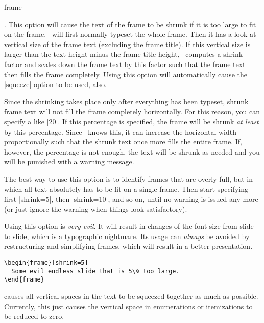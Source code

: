 \begin{environment}{{frame}}
\begin{frame}[<+->][plain]
\begin{frame}
  \item
    . This option will cause the text of the frame to be shrunk if it is too large to fit on the frame. \beamer\ will first normally typeset the whole frame. Then it has a look at vertical size of the frame text (excluding the frame title). If this vertical size is larger than the text height minus the frame title height, \beamer\ computes a shrink factor and scales down the frame text by this factor such that the frame text then fills the frame completely. Using this option will automatically cause the |squeeze| option to be used, also.

    Since the shrinking takes place only after everything has been typeset, shrunk frame text will not fill the frame completely horizontally. For this reason, you can specify a  like |20|. If this percentage is specified, the frame will be shrunk \emph{at least} by this percentage. Since \beamer\ knows this, it can increase the horizontal width proportionally such that the shrunk text once more fills the entire frame. If, however, the percentage is not enough, the text will be shrunk as needed and you will be punished with a warning message.

    The best way to use this option is to identify frames that are overly full, but in which all text absolutely has to be fit on a single frame. Then start specifying first |shrink=5|, then |shrink=10|, and so on, until no warning is issued any more (or just ignore the warning when things look satisfactory).

    Using this option is \emph{very evil}. It will result in changes of the font size from slide to slide, which is a typographic nightmare. Its usage can \emph{always} be avoided by restructuring and simplifying frames, which will result in a better presentation.

    \example
\begin{verbatim}
\begin{frame}[shrink=5]
  Some evil endless slide that is 5\% too large.
\end{frame}
\end{verbatim}

  \item
     causes all vertical spaces in the text to be squeezed together as much as possible. Currently, this just causes the vertical space in enumerations or itemizations to be reduced to zero.


\end{frame}
\end{frame}
\end{environment}
